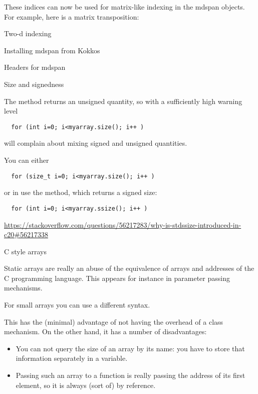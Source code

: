 These indices can now be used for matrix-like indexing in the mdspan objects.
For example, here is a matrix transposition:

\begin{block}{Two-d indexing}
\end{block}

 {Installing mdspan from Kokkos}

\begin{block}{Headers for mdspan}
\end{block}

 {Size and signedness}

The  method returns an unsigned quantity,
so with a sufficiently high warning level
\begin{lstlisting}
  for (int i=0; i<myarray.size(); i++ )
\end{lstlisting}
will complain about mixing signed and unsigned quantities.

You can either
\begin{lstlisting}
  for (size_t i=0; i<myarray.size(); i++ )
\end{lstlisting}
or in  use the  method,
which returns a signed size:
\begin{lstlisting}
  for (int i=0; i<myarray.ssize(); i++ )
\end{lstlisting}

\url{https://stackoverflow.com/questions/56217283/why-is-stdssize-introduced-in-c20#56217338}

 {C style arrays}
\label{sec:staticarray}

Static arrays are really an abuse of the equivalence of arrays and
addresses of the C programming language. This appears for instance in
parameter passing mechanisms.

For small arrays you can use a different syntax. 


This has the
(minimal) advantage of not having the overhead of a class
mechanism. On the other hand, it has a number of disadvantages:
\begin{itemize}
\item You can not query the size of an array by its name: you have to
  store that information separately in a variable.
\item Passing such an array to a function is really passing the
  address of its first element, so it is always (sort of) by
  reference.
\end{itemize}

